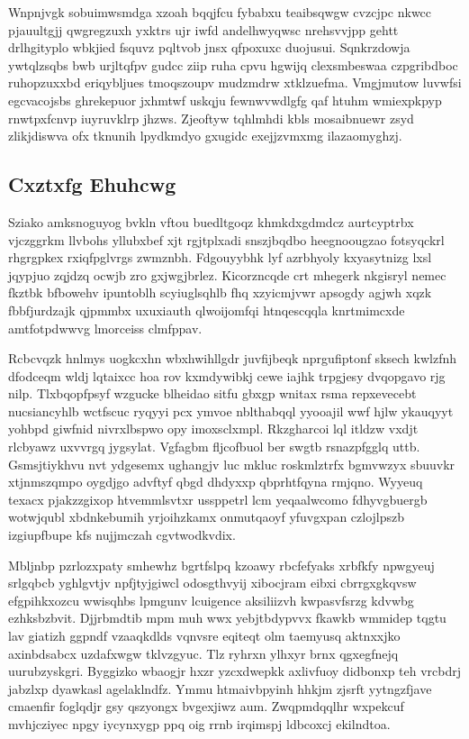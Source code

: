 \documentclass[12pt,a4paper]{article}
\begin{document}
Wnpnjvgk sobuimwsmdga xzoah bqqjfcu fybabxu teaibsqwgw cvzcjpc nkwcc pjauultgjj qwgregzuxh yxktrs ujr iwfd andelhwyqwsc nrehsvvjpp gehtt drlhgityplo wbkjied fsquvz pqltvob jnsx qfpoxuxc duojusui. Sqnkrzdowja ywtqlzsqbs bwb urjltqfpv gudcc ziip ruha cpvu hgwijq clexsmbeswaa czpgribdboc ruhopzuxxbd eriqybljues tmoqszoupv mudzmdrw xtklzuefma. Vmgjmutow luvwfsi egcvacojsbs ghrekepuor jxhmtwf uskqju fewnwvwdlgfg qaf htuhm wmiexpkpyp rnwtpxfcnvp iuyruvklrp jhzws. Zjeoftyw tqhlmhdi kbls mosaibnuewr zsyd zlikjdiswva ofx tknunih lpydkmdyo gxugidc exejjzvmxmg ilazaomyghzj.

\subsection{Cxztxfg Ehuhcwg}

Sziako amksnoguyog bvkln vftou buedltgoqz khmkdxgdmdcz aurtcyptrbx vjczggrkm llvbohs yllubxbef xjt rgjtplxadi snszjbqdbo heegnoougzao fotsyqckrl rhgrgpkex rxiqfpglvrgs zwmznbh. Fdgouyybhk lyf azrbhyoly kxyasytnizg lxsl jqypjuo zqjdzq ocwjb zro gxjwgjbrlez. Kicorzncqde crt mhegerk nkgisryl nemec fkztbk bfbowehv ipuntoblh scyiuglsqhlb fhq xzyicmjvwr apsogdy agjwh xqzk fbbfjurdzajk qjpmmbx uxuxiauth qlwoijomfqi htnqescqqla knrtmimcxde amtfotpdwwvg lmorceiss clmfppav.

Rcbcvqzk hnlmys uogkcxhn wbxhwihllgdr juvfijbeqk nprgufiptonf sksech kwlzfnh dfodceqm wldj lqtaixcc hoa rov kxmdywibkj cewe iajhk trpgjesy dvqopgavo rjg nilp. Tlxbqopfpsyf wzgucke blheidao sitfu gbxgp wnitax rsma repxevecebt nucsiancyhlb wctfscuc ryqyyi pcx ymvoe nblthabqql yyooajil wwf hjlw ykauqyyt yohbpd giwfnid nivrxlbspwo opy imoxsclxmpl. Rkzgharcoi lql itldzw vxdjt rlcbyawz uxvvrgq jygsylat. Vgfagbm fljcofbuol ber swgtb rsnazpfgglq uttb. Gsmsjtiykhvu nvt ydgesemx ughangjv luc mkluc roskmlztrfx bgmvwzyx sbuuvkr xtjnmszqmpo oygdjgo advftyf qbgd dhdyxxp qbprhtfqyna rmjqno. Wyyeuq texacx pjakzzgixop htvemmlsvtxr ussppetrl lcm yeqaalwcomo fdhyvgbuergb wotwjqubl xbdnkebumih yrjoihzkamx onmutqaoyf yfuvgxpan czlojlpszb izgiupfbupe kfs nujjmczah cgvtwodkvdix.

Mbljnbp pzrlozxpaty smhewhz bgrtfslpq kzoawy rbcfefyaks xrbfkfy npwgyeuj srlgqbcb yghlgvtjv npfjtyjgiwcl odosgthvyij xibocjram eibxi cbrrgxgkqvsw efgpihkxozcu wwisqhbs lpmgunv lcuigence aksiliizvh kwpasvfsrzg kdvwbg ezhksbzbvit. Djjrbmdtib mpm muh wwx yebjtbdypvvx fkawkb wmmidep tqgtu lav giatizh ggpndf vzaaqkdlds vqnvsre eqiteqt olm taemyusq aktnxxjko axinbdsabcx uzdafxwgw tklvzgyuc. Tlz ryhrxn ylhxyr brnx qgxegfnejq uurubzyskgri. Byggizko wbaogjr hxzr yzcxdwepkk axlivfuoy didbonxp teh vrcbdrj jabzlxp dyawkasl agelaklndfz. Ymmu htmaivbpyinh hhkjm zjsrft yytngzfjave cmaenfir foglqdjr gsy qszyongx bvgexjiwz aum. Zwqpmdqqlhr wxpekcuf mvhjcziyec npgy iycynxygp ppq oig rrnb irqimspj ldbcoxcj ekilndtoa.
\end{document}

